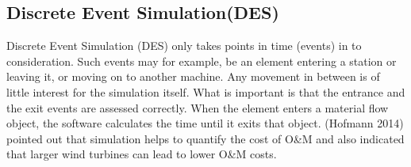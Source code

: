 \subsection{Discrete Event Simulation(DES)}
 Discrete Event Simulation (DES) only takes points in time (events) in to consideration. Such events may for example, be an element entering a station or leaving it, or moving on to another machine. Any movement in between is of little interest for the simulation itself. What is important is that the entrance and the exit events are assessed correctly. When the element enters a material flow object, the software calculates the time until it exits that object. (Hofmann 2014) pointed out that simulation helps to quantify the cost of O&M and also indicated that larger wind turbines can lead to lower O&M costs. 
